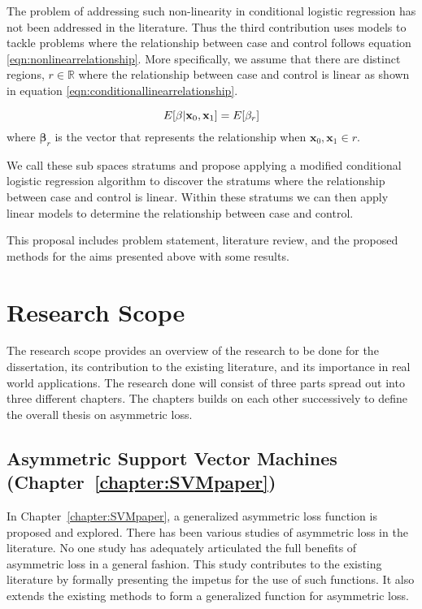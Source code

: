  The problem of addressing such non-linearity in conditional logistic regression has not been addressed in the literature. Thus the third contribution uses models to tackle problems where the relationship between case and control follows equation \ref{eqn:nonlinearrelationship}. More specifically, we assume that there are distinct regions, $r\in\mathbb{R}$ where the relationship between case and control is linear as shown in equation \ref{eqn:conditionallinearrelationship}.

\begin{equation}\label{eqn:conditionallinearrelationship}
	E[\mathbf{\beta}|\mathbf{x}_0,\mathbf{x}_1]=E[\mathbf{\beta}_r]\\
\end{equation}
where $\mathbf{\beta}_r$ is the vector that represents the relationship when $\mathbf{x}_0,\mathbf{x}_1 \in r$. 


 We call these sub spaces stratums and propose applying a modified conditional logistic regression algorithm to discover the stratums where the relationship between case and control is linear. Within these stratums we can then apply linear models to determine the relationship between case and control. 

This proposal includes problem statement, literature review, and the proposed methods for the aims presented above with some results.

\section{Research Scope}
The research scope provides an overview of the research to be done for the dissertation, its contribution to the existing literature, and its importance in real world applications. The research done will consist of three parts spread out into three different chapters. The chapters builds on each other successively to define the overall thesis on asymmetric loss. 

\subsection{Asymmetric Support Vector Machines (Chapter~\ref{chapter:SVMpaper})}
In Chapter~\ref{chapter:SVMpaper}, a generalized asymmetric loss function is proposed and explored. There has been various studies of asymmetric loss in the literature. No one study has adequately articulated the full benefits of asymmetric loss in a general fashion. This study contributes to the existing literature by formally presenting the impetus for the use of such functions. It also extends the existing methods to form a generalized function for asymmetric loss. 

